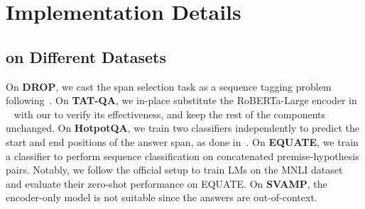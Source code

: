 \section{Implementation Details}\label{sec:append_imp}

\subsection{\oursroberta on Different Datasets}

On \textbf{DROP}, we cast the span selection task as a sequence tagging problem following~\citet{segal-etal-2020-simple}.
On \textbf{TAT-QA}, we in-place substitute the RoBERTa-Large encoder in \tagop~\citep{zhu-etal-2021-tat} with our \oursroberta to verify its effectiveness, and keep the rest of the components unchanged.
On \textbf{HotpotQA}, we train two classifiers independently to predict the start and end positions of the answer span, as done in~\citet{devlin-etal-2019-bert}.
On \textbf{EQUATE}, we train a classifier to perform sequence classification on concatenated premise-hypothesis pairs.
Notably, we follow the official setup to train LMs on the MNLI dataset~\cite{williams-etal-2018-broad} and evaluate their zero-shot performance on EQUATE.
On \textbf{SVAMP}, the encoder-only model is not suitable since the answers are out-of-context.


\begin{table*}[t]
\centering
{}
\caption{Breakdown of model \fone{} score by answer types on the dev set of DROP. Some works only report overall span type performance (marked by *), and single-span is non-separable from multi-span performance.
Bold and underlined numbers indicate the best and second-best results, respectively.
}
\label{tab:drop-by-type}    
\end{table*}

